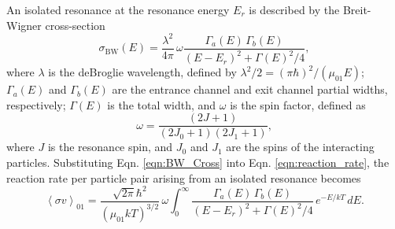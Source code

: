 An isolated resonance at the resonance energy $E_{r}$ is described by the Breit-Wigner cross-section \cite{Breit1936}
\begin{equation} \label{eqn:BW_Cross}
\sigma_{\mathrm{BW}}(E) = \frac{\lambda^{2}}{4 \pi} \, \omega \frac{\Gamma_{a}(E) \, \Gamma_{b}(E)}{\left(E - E_{r}\right)^{2} + \Gamma(E)^{2}/4},
\end{equation}
where $\lambda$ is the deBroglie wavelength, defined by $\lambda^{2}/2 = (\pi \hbar)^{2} / (\mu_{01} E)$; $\Gamma_{a}(E)$ and $\Gamma_{b}(E)$ are the entrance channel and exit channel partial widths, respectively; $\Gamma(E)$ is the total width, and $\omega$ is the spin factor, defined as
\begin{equation}
\omega = \frac{(2J+1)}{(2J_{0}+1) (2J_{1}+1)},
\end{equation}
where $J$ is the resonance spin, and $J_{0}$ and $J_{1}$ are the spins of the interacting particles. Substituting Eqn. \ref{eqn:BW_Cross} into Eqn. \ref{eqn:reaction_rate}, the reaction rate per particle pair arising from an isolated resonance becomes
\begin{equation}
\left\langle \sigma v \right\rangle_{01} = \frac{\sqrt{2 \pi} \hbar^{2}}{\left(\mu_{01} k T\right)^{3/2}} \, \omega \int_{0}^{\infty} \frac{\Gamma_{a}(E) \, \Gamma_{b}(E)}{\left(E - E_{r}\right)^{2} + \Gamma(E)^{2}/4} \, e^{-E/kT} \, dE.
\end{equation}

